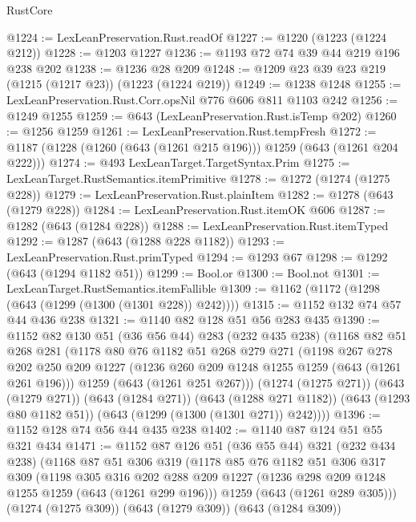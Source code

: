 \begin{lexlean}{RustCore}
\begin{coremodule}
@1224 := LexLeanPreservation.Rust.readOf
@1227 := @1220 (@1223 (@1224 @212))
@1228 := @1203 @1227
@1236 := @1193 @72 @74 @39 @44 @219 @196 @238 @202
@1238 := @1236 @28 @209
@1248 := @1209 @23 @39 @23 @219 (@1215 (@1217 @23)) (@1223 (@1224 @219))
@1249 := @1238 @1248
@1255 := LexLeanPreservation.Rust.Corr.opsNil @776 @606 @811 @1103 @242
@1256 := @1249 @1255
@1259 := @643 (LexLeanPreservation.Rust.isTemp @202)
@1260 := @1256 @1259
@1261 := LexLeanPreservation.Rust.tempFresh
@1272 := @1187 (@1228 (@1260 (@643 (@1261 @215 @196))) @1259 (@643 (@1261 @204 @222)))
@1274 := @493 LexLeanTarget.TargetSyntax.Prim
@1275 := LexLeanTarget.RustSemantics.itemPrimitive
@1278 := @1272 (@1274 (@1275 @228))
@1279 := LexLeanPreservation.Rust.plainItem
@1282 := @1278 (@643 (@1279 @228))
@1284 := LexLeanPreservation.Rust.itemOK @606
@1287 := @1282 (@643 (@1284 @228))
@1288 := LexLeanPreservation.Rust.itemTyped
@1292 := @1287 (@643 (@1288 @228 @1182))
@1293 := LexLeanPreservation.Rust.primTyped
@1294 := @1293 @67
@1298 := @1292 (@643 (@1294 @1182 @51))
@1299 := Bool.or
@1300 := Bool.not
@1301 := LexLeanTarget.RustSemantics.itemFallible
@1309 := @1162 (@1172 (@1298 (@643 (@1299 (@1300 (@1301 @228)) @242))))
@1315 := @1152 @132 @74 @57 @44 @436 @238
@1321 := @1140 @82 @128 @51 @56 @283 @435
@1390 := @1152
    @82
    @130
    @51
    (@36 @56 @44)
    @283
    (@232 @435 @238)
    (@1168
      @82
      @51
      @268
      @281
      (@1178
        @80
        @76
        @1182
        @51
        @268
        @279
        @271
        (@1198
          @267
          @278
          @202
          @250
          @209
          @1227
          (@1236 @260 @209 @1248 @1255 @1259 (@643 (@1261 @261 @196)))
          @1259
          (@643 (@1261 @251 @267)))
        (@1274 (@1275 @271))
        (@643 (@1279 @271))
        (@643 (@1284 @271))
        (@643 (@1288 @271 @1182))
        (@643 (@1293 @80 @1182 @51))
        (@643 (@1299 (@1300 (@1301 @271)) @242))))
@1396 := @1152 @128 @74 @56 @44 @435 @238
@1402 := @1140 @87 @124 @51 @55 @321 @434
@1471 := @1152
    @87
    @126
    @51
    (@36 @55 @44)
    @321
    (@232 @434 @238)
    (@1168
      @87
      @51
      @306
      @319
      (@1178
        @85
        @76
        @1182
        @51
        @306
        @317
        @309
        (@1198
          @305
          @316
          @202
          @288
          @209
          @1227
          (@1236 @298 @209 @1248 @1255 @1259 (@643 (@1261 @299 @196)))
          @1259
          (@643 (@1261 @289 @305)))
        (@1274 (@1275 @309))
        (@643 (@1279 @309))
        (@643 (@1284 @309))

\end{coremodule}
\end{lexlean}
